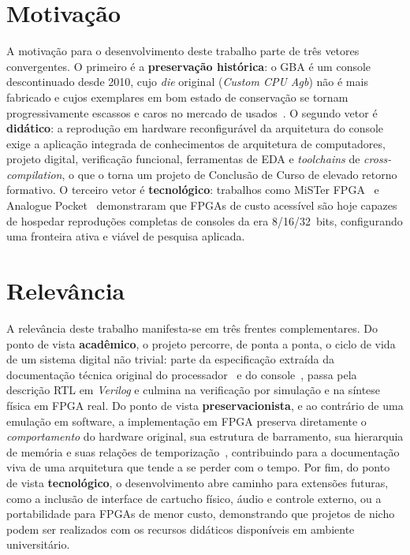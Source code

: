 \documentclass[pnumromarab,times]{politex}
\begin{document}
\section{Motivação}
\label{sec:motivacao}

A motivação para o desenvolvimento deste trabalho parte de três
vetores convergentes. O primeiro é a \textbf{preservação histórica}:
o GBA é um console descontinuado desde 2010, cujo \textit{die}
original (\textit{Custom CPU Agb}) não é mais fabricado e cujos
exemplares em bom estado de conservação se tornam progressivamente
escassos e caros no mercado de usados~\cite{Copetti2019}. O segundo
vetor é \textbf{didático}: a reprodução em hardware reconfigurável
da arquitetura do console exige a aplicação integrada de conhecimentos
de arquitetura de computadores, projeto digital, verificação funcional,
ferramentas de EDA e \textit{toolchains} de \textit{cross-compilation},
o que o torna um projeto de Conclusão de Curso de elevado retorno
formativo. O terceiro vetor é \textbf{tecnológico}: trabalhos como
MiSTer FPGA~\cite{MiSTer} e Analogue Pocket~\cite{AnaloguePocket}
demonstraram que FPGAs de custo acessível são hoje capazes de
hospedar reproduções completas de consoles da era 8/16/32~bits,
configurando uma fronteira ativa e viável de pesquisa aplicada.


\section{Relevância}
\label{sec:relevancia}

A relevância deste trabalho manifesta-se em três frentes
complementares. Do ponto de vista \textbf{acadêmico}, o projeto
percorre, de ponta a ponta, o ciclo de vida de um sistema digital
não trivial: parte da especificação extraída da documentação técnica
original do processador~\cite{ARM_DDI0210B,ARM_DVI0027B} e do
console~\cite{GBATEK,Copetti2019}, passa pela descrição RTL em
\emph{Verilog} e culmina na verificação por simulação e na síntese
física em FPGA real. Do ponto de vista \textbf{preservacionista}, e
ao contrário de uma emulação em software, a implementação em FPGA
preserva diretamente o \emph{comportamento} do hardware original,
sua estrutura de barramento, sua hierarquia de memória e suas
relações de temporização~\cite{HarrisHarris}, contribuindo para
a documentação viva de uma arquitetura que tende a se perder com o
tempo. Por fim, do ponto de vista \textbf{tecnológico}, o
desenvolvimento abre caminho para extensões futuras, como a
inclusão de interface de cartucho físico, áudio e controle externo,
ou a portabilidade para FPGAs de menor custo, demonstrando que
projetos de nicho podem ser realizados com os recursos didáticos
disponíveis em ambiente universitário.
\end{document}
